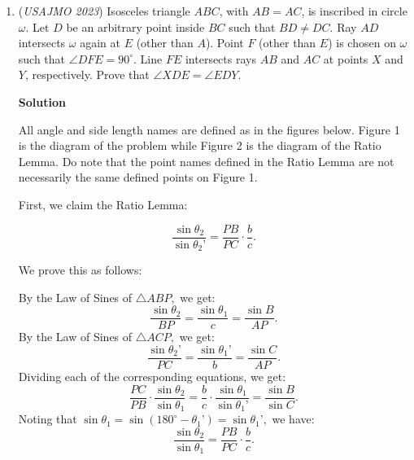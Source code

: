 \begin{enumerate}
 
Now, we complete the only if direction, i.e. if $\nu_{2} (n) \ge \nu_{2} (a),$ where $n$ is one of the numbers in the list, we will prove that Alice can keep the game going forever. 

 
Notice that Bob can only decrease $\nu_{2} (n)$ by $1$ at a time, and so if $\nu_{2} (n) \le \nu_{2} (a),$ we need $\nu_{2} (n) = \nu_{2} (a)$ at some point. But, then, if this is true, take $n = 2^{k}(2m+1),$ and $a = 2^{k}(2\ell+1),$ and notice that 
 \[a+n = 2^{k}(2m+1)+2^{k}(2\ell+1) = 2^{k}(2m+2\ell+2) = 2^{k+1}(m+\ell+1),\] so$\nu_{2}(a+n) > \nu_{2} (n).$Thus, if Bob gets $\nu_{2} (n)$ equal to $\nu_{2} (a),$ Alice can simply add $a$ to $n,$ and then $\nu_{2} (n) > \nu_{2} (a)$ again. Thus, Alice can keep the game going forever, and hence we are done.

 


	\item (\textit{USAJMO 2023}) Isosceles triangle $ABC$, with $AB=AC$, is inscribed in circle $\omega$. Let $D$ be an arbitrary point inside $BC$ such that $BD\neq DC$. Ray $AD$ intersects $\omega$ again at $E$ (other than $A$). Point $F$ (other than $E$) is chosen on $\omega$ such that $\angle DFE = 90^\circ$. Line $FE$ intersects rays $AB$ and $AC$ at points $X$ and $Y$, respectively. Prove that $\angle XDE = \angle EDY$.


 



\textbf{Solution}

All angle and side length names are defined as in the figures below. Figure 1 is the diagram of the problem while Figure 2 is the diagram of the Ratio Lemma. Do note that the point names defined in the Ratio Lemma are not necessarily the same defined points on Figure 1.

 First, we claim the Ratio Lemma:

 
 \[\frac{\sin{\theta_2}}{\sin{\theta_2’}}=\frac{PB}{PC}\cdot\frac{b}{c}.\]

 We prove this as follows:

 By the Law of Sines of $\triangle{ABP},$ we get:
 \[\frac{\sin\theta_2}{BP}=\frac{\sin\theta_1}{c}=\frac{\sin B}{AP}.\]By the Law of Sines of $\triangle{ACP},$ we get:
 \[\frac{\sin\theta_2’}{PC}=\frac{\sin\theta_1’}{b}=\frac{\sin C}{AP}.\]Dividing each of the corresponding equations, we get:
 \[\frac{PC}{PB}\cdot\frac{\sin\theta_2}{\sin\theta_1}=\frac{b}{c}\cdot\frac{\sin\theta_1}{\sin\theta_1’}=\frac{\sin B}{\sin C}.\]Noting that $\sin \theta_1= \sin(180^\circ - \theta_1’)=\sin \theta_1’,$ we have:
 \[\frac{\sin\theta_2}{\sin\theta_1}=\frac{PB}{PC}\cdot\frac{b}{c}.\]


\end{enumerate}
